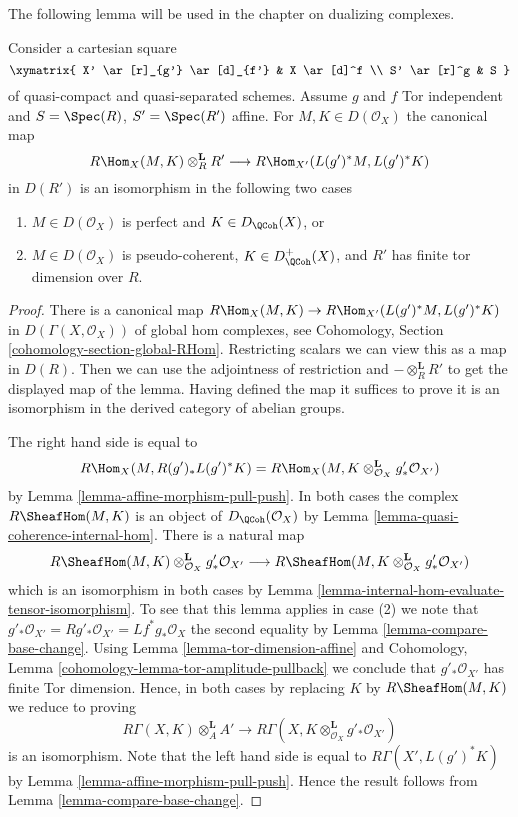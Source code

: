 \noindent
The following lemma will be used in the chapter on dualizing complexes.

\begin{lemma}
\label{lemma-affine-morphism-and-hom-out-of-perfect}
Consider a cartesian square
$$
\xymatrix{
X' \ar[r]_{g'} \ar[d]_{f'} & X \ar[d]^f \\
S' \ar[r]^g & S
}
$$
of quasi-compact and quasi-separated schemes. Assume $g$ and $f$
Tor independent and $S = \Spec(R)$, $S' = \Spec(R')$ affine. For
$M, K \in D(\mathcal{O}_X)$ the canonical map
$$
R\Hom_X(M, K) \otimes^\mathbf{L}_R R'
\longrightarrow
R\Hom_{X'}(L(g')^*M, L(g')^*K)
$$
in $D(R')$ is an isomorphism in the following two cases
\begin{enumerate}
\item $M \in D(\mathcal{O}_X)$ is perfect and $K \in D_\QCoh(X)$, or
\item $M \in D(\mathcal{O}_X)$ is pseudo-coherent,
$K \in D_\QCoh^+(X)$, and $R'$ has finite tor dimension over $R$.
\end{enumerate}
\end{lemma}

\begin{proof}
There is a canonical map
$R\Hom_X(M, K) \to R\Hom_{X'}(L(g')^*M, L(g')^*K)$
in $D(\Gamma(X, \mathcal{O}_X))$ of global hom complexes, see
Cohomology, Section \ref{cohomology-section-global-RHom}.
Restricting scalars we can view this as a map in $D(R)$.
Then we can use the adjointness of restriction and
$- \otimes_R^\mathbf{L} R'$ to get the displayed map of the lemma.
Having defined the map it suffices to prove it is an isomorphism
in the derived category of abelian groups.

\medskip\noindent
The right hand side is equal to
$$
R\Hom_X(M, R(g')_*L(g')^*K) =
R\Hom_X(M, K \otimes_{\mathcal{O}_X}^\mathbf{L} g'_*\mathcal{O}_{X'})
$$
by Lemma \ref{lemma-affine-morphism-pull-push}. In both cases the complex
$R\SheafHom(M, K)$ is an object of $D_\QCoh(\mathcal{O}_X)$ by
Lemma \ref{lemma-quasi-coherence-internal-hom}. There is a natural map
$$
R\SheafHom(M, K) \otimes_{\mathcal{O}_X}^\mathbf{L} g'_*\mathcal{O}_{X'}
\longrightarrow
R\SheafHom(M, K \otimes_{\mathcal{O}_X}^\mathbf{L} g'_*\mathcal{O}_{X'})
$$
which is an isomorphism in both cases by
Lemma \ref{lemma-internal-hom-evaluate-tensor-isomorphism}.
To see that this lemma applies in case (2) we note that
$g'_*\mathcal{O}_{X'} = Rg'_*\mathcal{O}_{X'} =
Lf^*g_*\mathcal{O}_X$ the second equality by
Lemma \ref{lemma-compare-base-change}.
Using Lemma \ref{lemma-tor-dimension-affine} and
Cohomology, Lemma \ref{cohomology-lemma-tor-amplitude-pullback}
we conclude that $g'_*\mathcal{O}_{X'}$ has finite Tor dimension.
Hence, in both cases by replacing $K$ by $R\SheafHom(M, K)$ we reduce
to proving
$$
R\Gamma(X, K) \otimes^\mathbf{L}_A A' \longrightarrow
R\Gamma(X, K \otimes^\mathbf{L}_{\mathcal{O}_X} g'_*\mathcal{O}_{X'})
$$
is an isomorphism.
Note that the left hand side is equal to $R\Gamma(X', L(g')^*K)$
by Lemma \ref{lemma-affine-morphism-pull-push}.
Hence the result follows from
Lemma \ref{lemma-compare-base-change}.
\end{proof}

